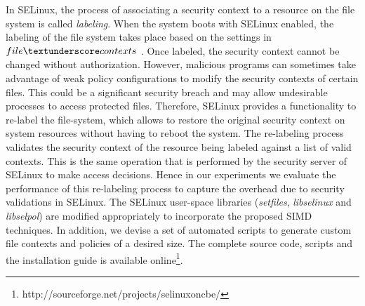 \documentclass[conference]{IEEEtran}
\begin{document}
In SELinux, the process of associating a security context to a resource on the file system is called \emph{labeling}. When the system boots
with SELinux enabled, the labeling of the file system takes place based on the settings
in $file\textunderscore contexts$ \cite{selinuxBook}. Once labeled, the security context cannot be changed without authorization. However,
malicious programs can sometimes take advantage of weak policy
configurations to modify the security contexts of certain files. This
could be a significant security breach and may allow undesirable
processes to access protected files. Therefore, SELinux provides a functionality to re-label the file-system, which allows to restore the original security context on system resources without having to reboot the system. The re-labeling process validates the security context of the resource being labeled against a list of valid contexts. This is the same operation that is performed by the security server of SELinux to make access decisions. Hence in our experiments we evaluate the performance of this re-labeling process to capture the overhead due to security validations in SELinux. The SELinux user-space libraries (\emph{setfiles}, \emph{libselinux} and \emph{libselpol}) are modified appropriately to incorporate the proposed SIMD techniques. In addition, we devise a
set of automated scripts to generate custom file contexts and policies
of a desired size. The complete source code, scripts and the
installation guide is available online\footnote{http://sourceforge.net/projects/selinuxoncbe/}.
\end{document}
